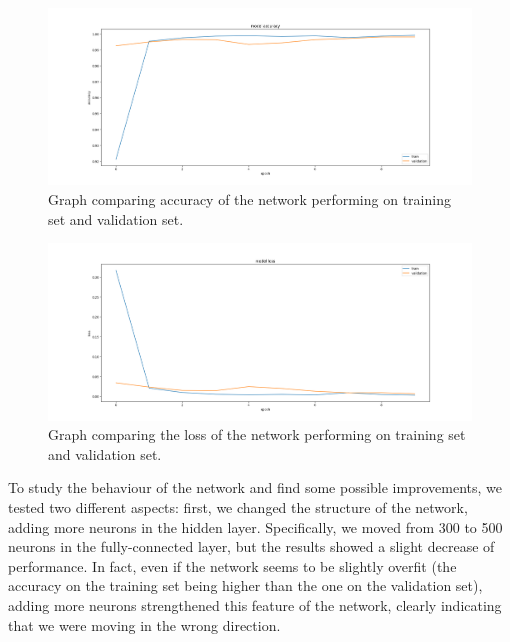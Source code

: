 \begin{figure}
	\centering
	\begin{minipage}{0.9\textwidth}
		\centering
		\includegraphics[width=1\textwidth]{300-acc_3.png}
	\end{minipage}
	\caption{Graph comparing accuracy of the network performing on training set and validation set.}
	\label{fig3-300-acc_3}
\end{figure}
\begin{figure}
	\centering
	\begin{minipage}{0.9\textwidth}
		\centering
		\includegraphics[width=1\textwidth]{300-loss_3.png} 
	\end{minipage}
	\caption{Graph comparing the loss of the network performing on training set and validation set.}
	\label{fig4-300-loss_3}
\end{figure}

To study the behaviour of the network and find some possible improvements, we tested two different aspects: first, we changed the structure of the network, adding more neurons in the hidden layer. Specifically, we moved from 300 to 500 neurons in the fully-connected layer, but the results showed a slight decrease of performance. In fact, even if the network seems to be slightly overfit (the accuracy on the training set being higher than the one on the validation set), adding more neurons strengthened this feature of the network, clearly indicating that we were moving in the wrong direction.

